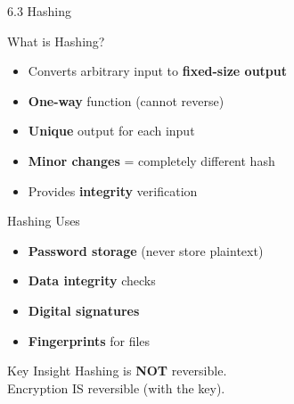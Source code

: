 \documentclass{beamer}
\begin{document}
	\begin{frame}{6.3 Hashing}
		\begin{block}{What is Hashing?}
			\begin{itemize}
				\item Converts arbitrary input to \textbf{fixed-size output}
				\item \textbf{One-way} function (cannot reverse)
				\item \textbf{Unique} output for each input
				\item \textbf{Minor changes} = completely different hash
				\item Provides \textbf{integrity} verification
			\end{itemize}
		\end{block}
		
		\begin{block}{Hashing Uses}
			\begin{itemize}
				\item \textbf{Password storage} (never store plaintext)
				\item \textbf{Data integrity} checks
				\item \textbf{Digital signatures}
				\item \textbf{Fingerprints} for files
			\end{itemize}
		\end{block}
		
		\begin{exampleblock}{Key Insight}
			Hashing is \textbf{NOT} reversible. \\
			Encryption IS reversible (with the key).
		\end{exampleblock}
	\end{frame}
	
\end{document}
